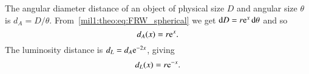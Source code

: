     The angular diameter distance of an object of physical size $D$ and angular size $\theta$ is $d_A= D/\theta$. From~\cref{mil1:theo:eq:FRW_spherical} we get $\diff D = r\eu^x \diff \theta$ and so  
    \begin{equation}\label{mil1:theo:eq:dA_of_x}
            d_A(x) =r \eu^x.
    \end{equation}
    The luminosity distance is $d_L= d_A\eu^{-2x}$, giving
    \begin{equation}\label{mil1:theo:eq:dL_of_x}
        d_L(x) = r\eu^{-x}.
    \end{equation}

